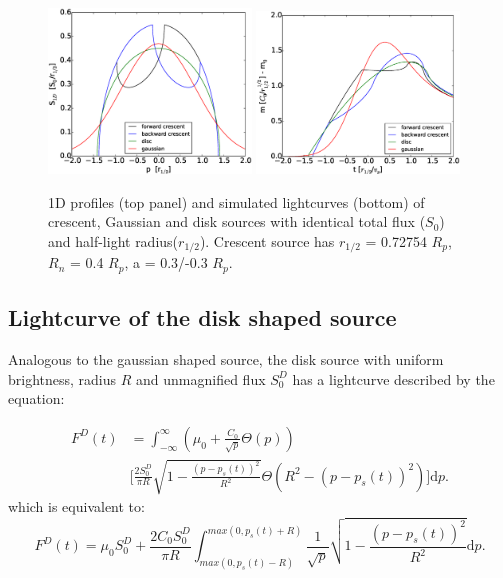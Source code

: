 \documentclass[usenatbib]{mn2e}
\begin{document}
\begin{figure}
\centering
    \includegraphics[width = 0.48\textwidth]{figures/S1D_all.eps}
    \includegraphics[width = 0.48\textwidth]{figures/4source_magnification.eps}
\caption{\label{fig:lightcurve_gauss} 1D profiles (top panel) and simulated lightcurves (bottom) of crescent, Gaussian and disk sources with identical total flux ($S_0$) and half-light radius($r_{1/2}$). Crescent source has $r_{1/2}$ = 0.72754 $R_p$, $R_n$ = 0.4 $R_p$, a = 0.3/-0.3 $R_p$. }
\end{figure}


\subsection{Lightcurve of the disk shaped source}

Analogous to the gaussian shaped source, the disk source with uniform brightness, radius $R$ and 
unmagnified flux $S_0^D$ has a lightcurve described by the equation:

\begin{equation}
\begin{aligned}
 F^D(t) &= \int_{-\infty}^\infty  \left( \mu_0 + \frac{C_0}{\sqrt{p}} \Theta \left( p \right) \right) \\
    & \bigg[ \frac{2 S_0^D}{ \pi R} \sqrt{1 - \frac{\left( p-p_s(t) \right)^2}{R^2}}  \Theta \left(R^2 - \left(p-p_s(t) \right)^2 \right) \bigg] \mathrm{d}p.
\end{aligned}
\end{equation}
which is equivalent to:
\begin{equation}
 F^D(t) = \mu_0 S_0^D + \frac{2 C_0 S_0^D}{\pi R} \int_{max(0, p_s(t) - R)}^{max(0, p_s(t) + R)} \frac{1}{\sqrt{p}} \sqrt{1 - \frac{\left( p-p_s(t) \right)^2}{R^2}} \mathrm{d}p.
\end{equation}
\end{document}
